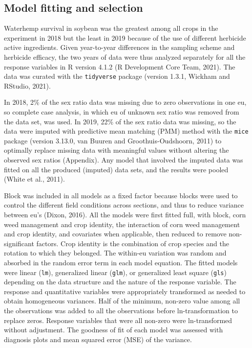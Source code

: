 \documentclass[
]{article}
\begin{document}
\hypertarget{model-fitting-and-selection}{%
\subsection*{Model fitting and selection}\label{model-fitting-and-selection}}

Waterhemp survival in soybean was the greatest among all crops in the experiment in 2018 but the least in 2019 because of the use of different herbicide active ingredients. Given year-to-year differences in the sampling scheme and herbicide efficacy, the two years of data were thus analyzed separately for all the response variables in R version 4.1.2 (R Development Core Team, 2021). The data was curated with the \texttt{tidyverse} package (version 1.3.1, Wickham and RStudio, 2021).

In 2018, 2\% of the sex ratio data was missing due to zero observations in one eu, so complete case analysis, in which eu of unknown sex ratio was removed from the data set, was used. In 2019, 22\% of the sex ratio data was missing, so the data were imputed with predictive mean matching (PMM) method with the \texttt{mice} package (version 3.13.0, van Buuren and Groothuis-Oudshoorn, 2011) to optimally replace missing data with meaningful values without altering the observed sex ratios (Appendix). Any model that involved the imputed data was fitted on all the produced (imputed) data sets, and the results were pooled (White et al., 2011).

Block was included in all models as a fixed factor because blocks were used to control the different field conditions across sections, and thus to reduce variance between eu's (Dixon, 2016). All the models were first fitted full, with block, corn weed management and crop identity, the interaction of corn weed management and crop identity, and covariates when applicable, then reduced to remove non-significant factors. Crop identity is the combination of crop species and the rotation to which they belonged. The within-eu variation was random and absorbed in the random error term in each model equation. The fitted models were linear (\texttt{lm}), generalized linear (\texttt{glm}), or generalized least square (\texttt{gls}) depending on the data structure and the nature of the response variable. The response and quantitative variables were appropriately transformed as needed to obtain homogeneous variances. Half of the minimum, non-zero value among all the observations was added to all the observations before ln-transformation to replace zeros. Response variables that were all non-zero were ln-transformed without adjustment. The goodness of fit of each model was assessed with diagnosis plots and mean squared error (MSE) of the variance.
\end{document}
